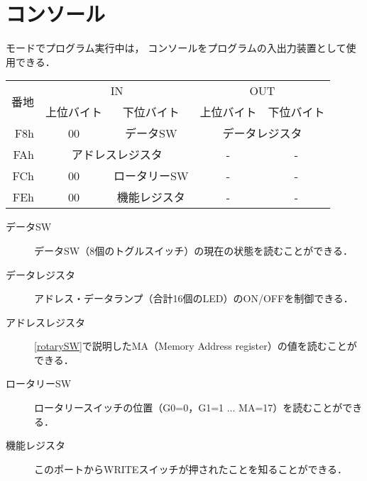 \section{コンソール}
{\tac}モードでプログラム実行中は，
コンソールをプログラムの入出力装置として使用できる．

\begin{center}
  \small\begin{tabular}{| r | c | c || c | c |}\hline
    \multirow{2}{*}{番地}
    & \multicolumn{2}{c||}{IN}
    & \multicolumn{2}{c|}{OUT}
    \\\cline{2-5}
         & 上位バイト & 下位バイト & 上位バイト & 下位バイト
    \\\hline\hline
    F8h  &  00 & データSW
         &  \multicolumn{2}{c|}{データレジスタ} \\\hline
    FAh  &  \multicolumn{2}{c||}{アドレスレジスタ}
         &  - & - \\\hline
    FCh  &  00 & ロータリーSW
         &  - & - \\\hline
    FEh  &  00 & 機能レジスタ
         &  - & - \\\hline
  \end{tabular}
\end{center}

\begin{description}
\item[データSW]
  データSW（8個のトグルスイッチ）の現在の状態を読むことができる．
\item[データレジスタ]
  アドレス・データランプ（合計16個のLED）のON/OFFを制御できる．
\item[アドレスレジスタ]
  \ref{rotarySW}で説明したMA（Memory Address register）の値を読むことができる．
\item[ロータリーSW]
  ロータリースイッチの位置（G0=0，G1=1 ... MA=17）を読むことができる．
\item[機能レジスタ]
  このポートからWRITEスイッチが押されたことを知ることができる．
\end{description}


